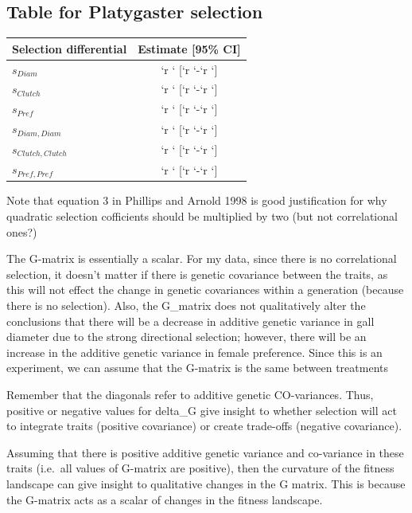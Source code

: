 \documentclass[]{elsarticle} %
\begin{document}
\subsection{Table for Platygaster
selection}\label{table-for-platygaster-selection}

\begin{table}[]
\begin{tabular}{lc}
                                                                  \\ \hline
\textbf{Selection differential} & \textbf{Estimate [95\% CI]}     \\ \hline
$s_{Diam}$                      & `r ` [`r `-`r `]  \\
$s_{Clutch}$                    & `r ` [`r `-`r `]  \\
$s_{Pref}$                      & `r ` [`r `-`r `]  \\ 
$s_{Diam,Diam}$                 & `r ` [`r `-`r `]  \\
$s_{Clutch,Clutch}$             & `r ` [`r `-`r `]  \\
$s_{Pref,Pref}$                 & `r ` [`r `-`r `]                \\ \hline
\end{tabular}
\end{table}

Note that equation 3 in Phillips and Arnold 1998 is good justification
for why quadratic selection cofficients should be multiplied by two (but
not correlational ones?)

The G-matrix is essentially a scalar. For my data, since there is no
correlational selection, it doesn't matter if there is genetic
covariance between the traits, as this will not effect the change in
genetic covariances within a generation (because there is no selection).
Also, the G\_matrix does not qualitatively alter the conclusions that
there will be a decrease in additive genetic variance in gall diameter
due to the strong directional selection; however, there will be an
increase in the additive genetic variance in female preference. Since
this is an experiment, we can assume that the G-matrix is the same
between treatments

Remember that the diagonals refer to additive genetic CO-variances.
Thus, positive or negative values for delta\_G give insight to whether
selection will act to integrate traits (positive covariance) or create
trade-offs (negative covariance).

Assuming that there is positive additive genetic variance and
co-variance in these traits (i.e.~all values of G-matrix are positive),
then the curvature of the fitness landscape can give insight to
qualitative changes in the G matrix. This is because the G-matrix acts
as a scalar of changes in the fitness landscape.
\end{document}
